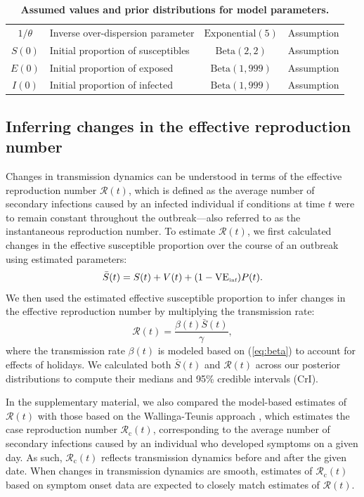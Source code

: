 \documentclass[12pt]{article}
\newcommand{\eref}[1]{(\ref{eq:#1})}
\begin{document}
\begin{table}[!t]
\begin{center}
\begin{tabular}{c|p{6cm}|c|l}
$1/\theta$ & Inverse over-dispersion parameter & $\textrm{Exponential}(5)$ & Assumption \\
$S(0)$ & Initial proportion of susceptibles & $\textrm{Beta}(2, 2)$ & Assumption \\
$E(0)$ & Initial proportion of exposed & $\textrm{Beta}(1, 999)$ & Assumption \\
$I(0)$ & Initial proportion of infected & $\textrm{Beta}(1, 999)$ & Assumption \\
\hline
\end{tabular}
\caption{
\textbf{Assumed values and prior distributions for model parameters.}
}
\end{center}
\end{table}

\subsection{Inferring changes in the effective reproduction number}

Changes in transmission dynamics can be understood in terms of the effective reproduction number $\mathcal{R}(t)$, which is defined as the average number of secondary infections caused by an infected individual if conditions at time $t$ were to remain constant throughout the outbreak---also referred to as the instantaneous reproduction number. 
To estimate $\mathcal{R}(t)$, we first calculated changes in the effective susceptible proportion over the course of an outbreak using estimated parameters: 
\begin{equation}
\bar{S}(t) = S(t) + V(t) + (1-\mathrm{VE}_{\textrm{\tiny{inf}}}) P(t).
\end{equation}
We then used the estimated effective susceptible proportion to infer changes in the effective reproduction number by multiplying the transmission rate:
\begin{equation}
\mathcal R(t) = \frac{\beta(t) \bar{S}(t)}{\gamma},
\end{equation}
where the transmission rate $\beta(t)$ is modeled based on \eref{beta} to account for effects of holidays.
We calculated both $\bar{S}(t)$ and $\mathcal R(t)$ across our posterior distributions to compute their medians and 95\% credible intervals (CrI).

In the supplementary material, we also compared the model-based estimates of $\mathcal R(t)$ with those based on the Wallinga-Teunis approach \citep{wallinga2004different}, which estimates the case reproduction number $\mathcal{R}_{\mathrm c}(t)$, corresponding to the average number of secondary infections caused by an individual who developed symptoms on a given day. As such, $\mathcal{R}_{\mathrm c}(t)$ reflects transmission dynamics before and after the given date.
When changes in transmission dynamics are smooth, estimates of $\mathcal{R}_{\mathrm c}(t)$ based on symptom onset data are expected to closely match estimates of $\mathcal R(t)$.
\end{document}
